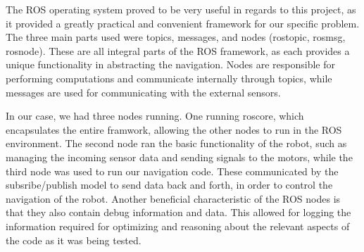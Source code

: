 \documentclass[conference]{IEEEtran}
\begin{document}
The ROS operating system proved to be very useful in regards to this project, as it provided a greatly practical and convenient framework for our specific problem.
The three main parts used were topics, messages, and nodes (rostopic, rosmsg, rosnode). These are all integral parts of the ROS framework, as each provides a unique functionality in abstracting the navigation.
Nodes are responsible for performing computations and communicate internally through topics, while messages are used for communicating with the external sensors.

In our case, we had three nodes running. One running roscore, which encapsulates the entire framwork, allowing the other nodes to run in the ROS environment.
The second node ran the basic functionality of the robot, such as managing the incoming sensor data and sending signals to the motors, while the third node was used to run our navigation code.
These communicated by the subsribe/publish model to send data back and forth, in order to control the navigation of the robot.
Another beneficial characteristic of the ROS nodes is that they also contain debug information and data. This allowed for logging the information required for optimizing and reasoning about the relevant aspects of the code as it was being tested.
\end{document}
